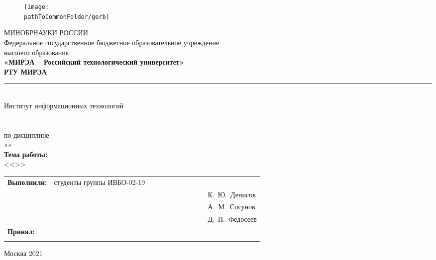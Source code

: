 

\renewcommand{\studentfio}{К.~Ю.~Денисов\\
				& & \hfill А.~М.~Сосунов\\
				& & \hfill Д.~Н.~Федосеев}

\begin{center}
	\begin{figure}[h!]
		\begin{center}
			\texttt{[image: \\pathToCommonFolder/gerb]}
		\end{center}	
	\end{figure}
	\small	МИНОБРНАУКИ РОССИИ \\
	Федеральное государственное бюджетное образовательное учреждение\\
	высшего образования\\
	\normalsize					
	\textbf{«МИРЭА – Российский технологический университет»\\
		РТУ МИРЭА}\\
	\noindent\rule{1\linewidth}{1pt}\\
	Институт информационных технологий\\ %
	\kafedra\\
	\vspace{3ex}
	\large \textbf{\workname}  \\
	по дисциплине\\ «\discipline» \\
	\vspace{3ex}
	\if \withouttheme
	\textbf{Тема работы:}\\ <<\theme>>
	\fi
	\vspace{6ex}
	\small
	\begin{table}[h!]
		\begin{tabular}{lp{0.6\linewidth}l}
			\textbf{Выполнили:} & студенты группы ИВБО-02-19 & \\ 
			& & \hfill \studentfio \\%
			\textbf{Принял:} & \rang & \\
			& & \hfill \teacherfio\\
		\end{tabular}
	\end{table}

	\normalsize
	
	\vfill
	Москва 2021
	
\end{center}